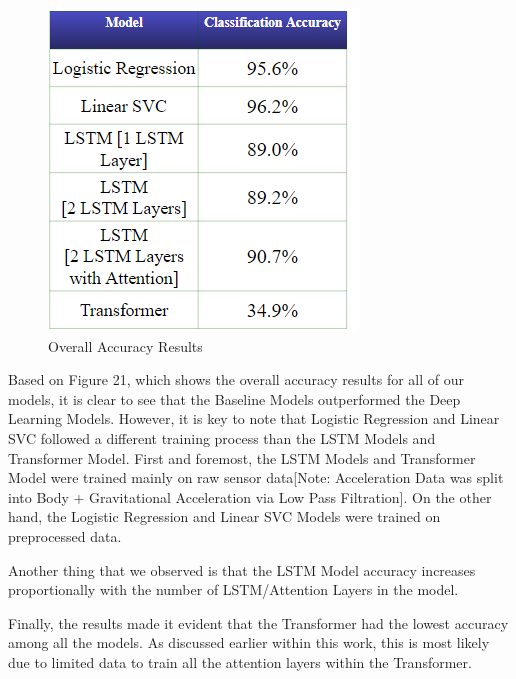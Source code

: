 \documentclass[conference]{IEEEtran}
\begin{document}
\begin{figure}[h!]
    \centering
    \includegraphics[width= 0.9 \linewidth]{results_IOT.png}
    \caption{Overall Accuracy Results}
    \label{results_IOT.png}
\end{figure}

Based on Figure 21, which shows the overall accuracy results for all of our models, it is clear to see that the Baseline Models outperformed the Deep Learning Models. However, it is key to note that Logistic Regression and Linear SVC followed a different training process than the LSTM Models and Transformer Model. First and foremost, the LSTM Models and Transformer Model were trained mainly on raw sensor data[Note: Acceleration Data was split into Body + Gravitational Acceleration via Low Pass Filtration]. On the other hand, the Logistic Regression and Linear SVC Models were trained on preprocessed data. \newline 

Another thing that we observed is that the LSTM Model accuracy increases proportionally with the number of LSTM/Attention Layers in the model. \newline 

Finally, the results made it evident that the Transformer had the lowest accuracy among all the models. As discussed earlier within this work, this is most likely due to limited data to train all the attention layers within the Transformer.
\end{document}
